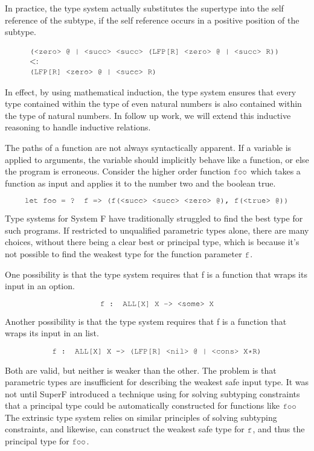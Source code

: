 \documentclass[acmsmall]{acmart}
\theoremstyle{definition}
\begin{document}
In practice, the type system actually substitutes the supertype into
the self reference of the subtype, if the self reference occurs in a positive position of the subtype.

\[
  \begin{array}[t]{@{} l}
    \J{(<zero> @ | <succ> <succ> (LFP[R] <zero> @ | <succ> R))} 
    \\
    \subtypes 
    \\
    \J{(LFP[R] <zero> @ | <succ> R)}
  \end{array}
\]


In effect, by using mathematical induction, the type system ensures that 
every type contained within the type of even natural numbers is also
contained within the type of natural numbers.
In follow up work, we will extend this inductive reasoning to handle inductive relations. 


The paths of a function are not always syntactically apparent. 
If a variable is applied to arguments, the variable should implicitly behave 
like a function, or else the program is erroneous. 
Consider the higher order function $\J{foo}$ which takes a function as input
and applies it to the number two and the boolean true.

\[
  \J{let foo = ? f => (f(<succ> <succ> <zero> @), f(<true> @))}
\]

Type systems for System F have traditionally struggled to find the best
type for such programs. If restricted to unqualified parametric types alone, there are many choices,
without there being a clear best or principal type, 
which is because it's not possible to find the weakest type for the function parameter
$\J{f}$.

One possibility is that the type system requires that f is a function that wraps its
input in an option. 

\[
  \J{f : ALL[X] X -> <some> X}
\]

Another possibility is that the type system requires that f is a function that wraps its
input in an list. 

\[
  \J{f : ALL[X] X -> (LFP[R] <nil> @ | <cons> X*R)}
\]

Both are valid, but neither is weaker than the other. The problem is that parametric
types are insufficient for describing the weakest safe input type.
It was not until SuperF introduced a technique using for solving subtyping constraints
that a principal type could be automatically constructed for functions like $\J{foo}$
The extrinsic type system relies on similar principles of solving subtyping constraints,
and likewise, can construct the weakest safe type for $\J{f}$, and thus the principal type for $\J{foo}$.
\end{document}
